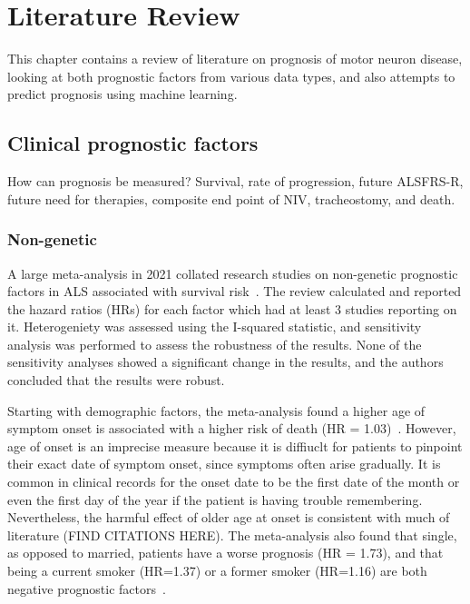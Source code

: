 \chapter{Literature Review}
\label{literature_review}

This chapter contains a review of literature on prognosis of motor neuron disease, looking at both prognostic factors from various data types, and also attempts to predict prognosis using machine learning.

\section{Clinical prognostic factors}

How can prognosis be measured? Survival, rate of progression, future ALSFRS-R, future need for therapies, composite end point of NIV, tracheostomy, and death.

\subsection{Non-genetic}

A large meta-analysis in 2021 collated research studies on non-genetic prognostic factors in ALS associated with survival risk~\cite{suPredictorsSurvivalPatients2021}.
The review calculated and reported the hazard ratios (HRs) for each factor which had at least 3 studies reporting on it. Heterogeniety was assessed using the I-squared statistic, and sensitivity analysis was performed to assess the robustness of the results.
None of the sensitivity analyses showed a significant change in the results, and the authors concluded that the results were robust.

Starting with demographic factors, the meta-analysis found a higher age of symptom onset is associated with a higher risk of death (HR = 1.03)~\cite{suPredictorsSurvivalPatients2021}. However, age of onset is an imprecise measure because it is diffiuclt for patients to pinpoint their exact date of symptom onset, since symptoms often arise gradually.
It is common in clinical records for the onset date to be the first date of the month or even the first day of the year if the patient is having trouble remembering. Nevertheless, the harmful effect of older age at onset is consistent with much of literature (FIND CITATIONS HERE).
The meta-analysis also found that single, as opposed to married, patients have a worse prognosis (HR = 1.73), and that being a current smoker (HR=1.37) or a former smoker (HR=1.16) are both negative prognostic factors~\cite{suPredictorsSurvivalPatients2021}.

